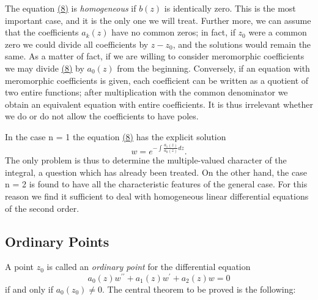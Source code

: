 The equation \hyperref[eq:8.8]{(8)} is \emph{homogeneous} if $b(z)$ is identically zero. This is the most important case, and it is the only one we will treat. Further%
%
more, we can assume that the coefficients $a_{k}(z)$ have no common zeros; in fact, if $z_{0}$ were a common zero we could divide all coefficients by $z - z_{0}$, and the solutions would remain the same. As a matter of fact, if we are willing to consider meromorphic coefficients we may divide \hyperref[eq:8.8]{(8)} by $a_{0}(z)$ from the beginning. Conversely, if an equation with meromorphic coefficients is given, each coefficient can be written as a quotient of two entire functions; after multiplication with the common denominator we obtain an equivalent equation with entire coefficients. It is thus irrelevant whether we do or do not allow the coefficients to have poles.

In the case n = 1 the equation \hyperref[eq:8.8]{(8)} has the explicit solution
\begin{equation*}
w = e ^ {- \int \frac {a _ {1} (z)}{a _ {0} (z)} d z}.
\end{equation*}
The only problem is thus to determine the multiple-valued character of the integral, a question which has already been treated. On the other hand, the case n = 2 is found to have all the characteristic features of the general case. For this reason we find it sufficient to deal with homogeneous linear differential equations of the second order.

\setcounter{section}{4}\setcounter{subsection}{0}\subsection{Ordinary Points}\label{sec:8.4.1}
A point $z_0$ is called an \emph{ordinary point} for the differential equation
\begin{equation*}
a _ {0} (z) w ^ {\prime \prime} + a _ {1} (z) w ^ {\prime} + a _ {2} (z) w = 0\tag{10}\label{eq:8.10}
\end{equation*}
if and only if $a_0(z_0) \neq 0$. The central theorem to be proved is the following:

